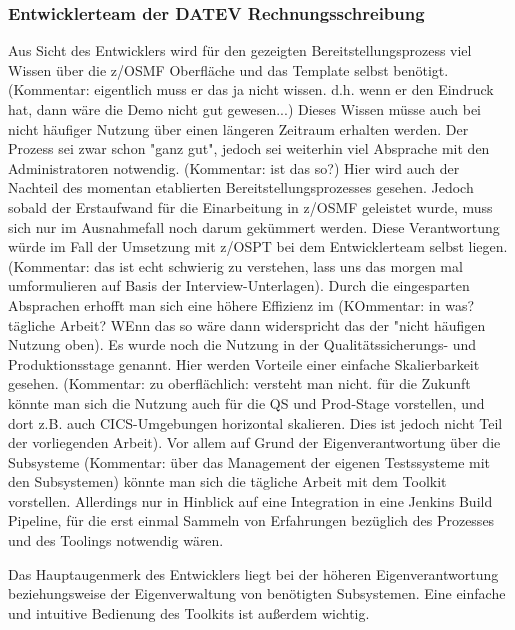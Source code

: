 \subsubsection{Entwicklerteam der DATEV Rechnungsschreibung}
Aus Sicht des Entwicklers wird für den gezeigten Bereitstellungsprozess viel Wissen über die z/OSMF Oberfläche und das Template selbst benötigt. (Kommentar: eigentlich muss er das ja nicht wissen. d.h. wenn er den Eindruck hat, dann wäre die Demo nicht gut gewesen...)
Dieses Wissen müsse auch bei nicht häufiger Nutzung über einen längeren Zeitraum erhalten werden.
Der Prozess sei zwar schon "ganz gut", jedoch sei weiterhin viel Absprache mit den Administratoren notwendig. (Kommentar: ist das so?)
Hier wird auch der Nachteil des momentan etablierten Bereitstellungsprozesses gesehen.
Jedoch sobald der Erstaufwand für die Einarbeitung in z/OSMF geleistet wurde, muss sich nur im Ausnahmefall noch darum gekümmert werden.
Diese Verantwortung würde im Fall der Umsetzung mit z/OSPT bei dem Entwicklerteam selbst liegen. (Kommentar: das ist echt schwierig zu verstehen, lass uns das morgen mal umformulieren auf Basis der Interview-Unterlagen).
Durch die eingesparten Absprachen erhofft man  sich eine höhere Effizienz im  (KOmmentar: in was? tägliche Arbeit? WEnn das so wäre dann widerspricht das der "nicht häufigen Nutzung oben).
Es wurde noch die Nutzung in der Qualitätssicherungs- und Produktionsstage genannt.
Hier werden Vorteile einer einfache Skalierbarkeit gesehen. (Kommentar: zu oberflächlich: versteht man nicht. für die Zukunft könnte man sich die Nutzung auch für die QS und Prod-Stage vorstellen, und dort z.B. auch CICS-Umgebungen horizontal skalieren. Dies ist jedoch nicht Teil der vorliegenden Arbeit).
Vor allem auf Grund der Eigenverantwortung über die Subsysteme (Kommentar: über das Management der eigenen Testssysteme mit den Subsystemen) könnte man sich die tägliche Arbeit mit dem Toolkit vorstellen.
Allerdings nur in Hinblick auf eine Integration in eine Jenkins Build Pipeline, für die erst einmal Sammeln von Erfahrungen bezüglich des Prozesses und des Toolings notwendig wären.

Das Hauptaugenmerk des Entwicklers liegt bei der höheren Eigenverantwortung beziehungsweise der Eigenverwaltung von benötigten Subsystemen.
Eine einfache und intuitive Bedienung des Toolkits ist außerdem wichtig.

